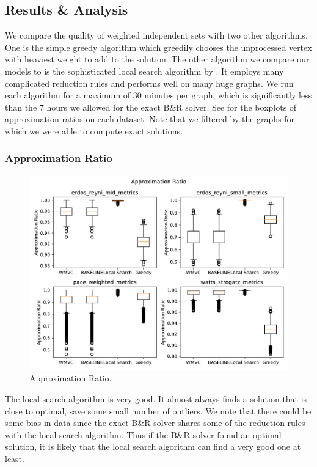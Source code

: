 \documentclass{article}
\begin{document}
\subsection{Results \& Analysis}
We compare the quality of weighted independent sets with two other algorithms.
One is the simple greedy algorithm which greedily chooses the unprocessed vertex with heaviest weight
to add to the solution.
The other algorithm we compare our models to is the sophisticated local search algorithm by \citet{kamis}.
It employs many complicated reduction rules
and performs well on many huge graphs.
We run each algorithm for a maximum of 30 minutes per graph,
which is significantly less than the 7 hours we allowed for the exact B\&R solver.
See  for the boxplots of approximation ratios on each dataset.
Note that we filtered by the graphs for which we were able to compute exact solutions.

\subsubsection{Approximation Ratio}
\begin{figure}
     \centering
     \includegraphics[width=\textwidth]{figures/approx_ratio}
     \caption{Approximation Ratio.}
     \label{fig:approx_ratio}
\end{figure}

The local search algorithm is very good.
It almost always finds a solution that is close to optimal,
save some small number of outliers.
We note that there could be some bias in data
since the exact B\&R solver shares some of the reduction rules with the local search algorithm.
Thus if the B\&R solver found an optimal solution,
it is likely that the local search algorithm can find a very good one at least.
\end{document}
